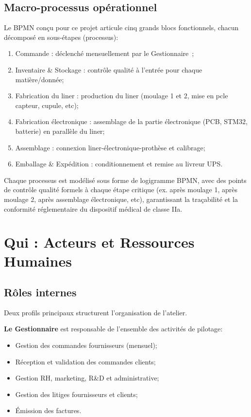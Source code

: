 \subsection{Macro-processus opérationnel}

Le BPMN conçu pour ce projet articule cinq grands blocs fonctionnels, chacun décomposé en
sous-étapes (processus):

\begin{enumerate}
  \item Commande : déclenché mensuellement par le Gestionnaire~;
  \item Inventaire \& Stockage : contrôle qualité à l'entrée pour chaque matière/donnée;
  \item Fabrication du liner : production du liner (moulage 1 et 2, mise en pcle capteur, cupule, etc);
  \item Fabrication électronique : assemblage de la partie électronique (PCB, STM32, batterie) en parallèle du liner;
  \item Assemblage : connexion liner-électronique-prothèse et calibrage;
  \item Emballage \& Expédition : conditionnement et remise au livreur UPS.
\end{enumerate}

Chaque processus est modélisé sous forme de logigramme BPMN, avec des points de contrôle qualité formels à chaque étape critique (ex. après moulage 1, après moulage 2, après assemblage électronique, etc),
garantissant la traçabilité et la conformité réglementaire du dispositif médical de classe IIa.

\section{Qui : Acteurs et Ressources Humaines}

\subsection{Rôles internes}

Deux profils principaux structurent l'organisation de l'atelier.

\textbf{Le Gestionnaire} est responsable de l'ensemble des activités de pilotage:
\begin{itemize}
  \item Gestion des commandes fournisseurs (mensuel);
  \item Réception et validation des commandes clients;
  \item Gestion RH, marketing, R\&D et administrative;
  \item Gestion des litiges fournisseurs et clients;
  \item Émission des factures.
\end{itemize}

